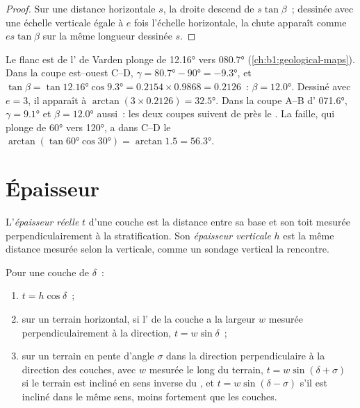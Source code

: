 \begin{proof}
Sur une distance horizontale $s$, la droite descend de $s\tan\beta$~; dessinée
avec une échelle verticale égale à $e$ fois l'échelle horizontale, la chute
apparaît comme $es\tan\beta$ sur la même longueur dessinée $s$.
\end{proof}

\begin{example}
Le flanc est de l' de Varden plonge de \ang{12.16} vers \ang{080.7}
(\cref{ch:b1:geological-maps}). Dans la coupe est--ouest C--D,
$\gamma = \ang{80.7} - \ang{90} = \ang{-9.3}$, et $\tan\beta =
\tan\ang{12.16}\cos\ang{9.3} = 0.2154\times0.9868 = 0.2126$~: $\beta =
\ang{12.0}$. Dessiné avec $e = 3$, il apparaît à $\arctan(3\times0.2126) =
\ang{32.5}$. Dans la coupe A--B d' \ang{071.6}, $\gamma = \ang{9.1}$
et $\beta = \ang{12.0}$ aussi~: les deux coupes suivent de près le . La faille, qui plonge de \ang{60} vers \ang{120}, a dans C--D le
 $\arctan(\tan\ang{60}\cos\ang{30}) = \arctan 1.5 = \ang{56.3}$.
\end{example}

\section{Épaisseur}

\begin{definition}\label{def:b1:cross-sections:thickness}
L'\emph{épaisseur réelle} $t$ d'une couche est la
distance entre sa base et son toit mesurée perpendiculairement à la
stratification. Son \emph{épaisseur verticale} $h$ est la même distance mesurée
selon la verticale, comme un sondage vertical la rencontre.
\end{definition}

\begin{proposition}\label{prop:b1:cross-sections:thickness}
Pour une couche de  $\delta$~:
\begin{enumerate}
  \item $t = h\cos\delta$~;
  \item sur un terrain horizontal, si l' de la couche a la largeur
        $w$ mesurée perpendiculairement à la direction, $t = w\sin\delta$~;
  \item sur un terrain en pente d'angle $\sigma$ dans la direction
        perpendiculaire à la direction des couches, avec $w$ mesurée le long du
        terrain, $t = w\sin(\delta + \sigma)$ si le terrain est incliné en sens
        inverse du , et $t = w\sin(\delta - \sigma)$ s'il est incliné dans
        le même sens, moins fortement que les couches.
\end{enumerate}
\end{proposition}

